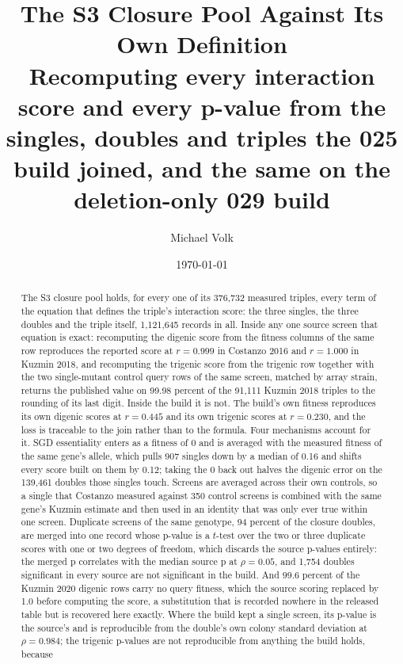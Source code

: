 \documentclass[10pt,a4paper]{article}
\title{\vspace{-1.5em}The S3 Closure Pool Against Its Own Definition\\
  {\large Recomputing every interaction score and every p-value from the singles,
   doubles and triples the 025 build joined, and the same on the deletion-only 029 build}}
\author{Michael Volk}
\date{\today}
\begin{document}
\maketitle
\thispagestyle{empty}

\begin{abstract}
\noindent
The S3 closure pool holds, for every one of its 376{,}732 measured triples, every
term of the equation that defines the triple's interaction score: the three singles,
the three doubles and the triple itself, 1{,}121{,}645 records in all. Inside any one
source screen that equation is exact: recomputing the digenic score from the fitness
columns of the same row reproduces the reported score at $r = 0.999$ in Costanzo 2016
and $r = 1.000$ in Kuzmin 2018, and recomputing the trigenic score from the trigenic
row together with the two single-mutant control query rows of the same screen, matched
by array strain, returns the published value on 99.98 percent of the 91{,}111 Kuzmin
2018 triples to the rounding of its last digit.
Inside the build it is not. The build's own fitness
reproduces its own digenic scores at $r = 0.445$ and its own trigenic scores at
$r = 0.230$, and the loss is traceable to the join rather than to the formula. Four
mechanisms account for it. SGD essentiality enters as a fitness of 0 and is averaged
with the measured fitness of the same gene's allele, which pulls 907 singles down by a
median of 0.16 and shifts every score built on them by 0.12; taking the 0 back out
halves the digenic error on the 139{,}461 doubles those singles touch. Screens are
averaged across their own controls, so a single that Costanzo measured against 350
control screens is combined with the same gene's Kuzmin estimate and then used in an
identity that was only ever true within one screen. Duplicate screens of the same
genotype, 94 percent of the closure doubles, are merged into one record whose p-value
is a $t$-test over the two or three duplicate scores with one or two degrees of
freedom, which discards the source p-values entirely: the merged p correlates with the
median source p at $\rho = 0.05$, and 1{,}754 doubles significant in every source are
not significant in the build. And 99.6 percent of the Kuzmin 2020 digenic rows carry no
query fitness, which the source scoring replaced by 1.0 before computing the score, a
substitution that is recorded nowhere in the released table but is recovered here
exactly. Where the build kept a single screen, its p-value is the source's and is
reproducible from the double's own colony standard deviation at $\rho = 0.984$;
the trigenic p-values are not reproducible from anything the build holds, because

\end{abstract}
\end{document}
